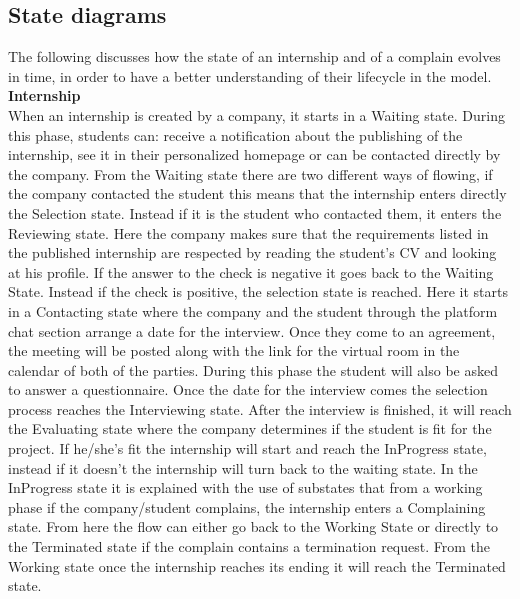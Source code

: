 \subsection{State diagrams}
The following discusses how the state of an internship and of a complain evolves in time, in order to have a better understanding of their lifecycle in the model.\\
\textbf{Internship}\\
When an internship is created by a company, it starts in a Waiting state. During this phase, students can: receive a notification about the publishing of the internship, see it in their personalized homepage or can be contacted directly by the company. From the Waiting state there are two different ways of flowing, if the company contacted the student this means that the internship enters directly the Selection state. Instead if it is the student who contacted them, it enters the Reviewing state. Here the company makes sure that the requirements listed in the published internship are respected by reading the student's CV and looking at his profile. If the answer to the check is negative it goes back to the Waiting State. Instead if the check is positive, the selection state is reached. Here it starts in a Contacting state where the company and the student through the platform chat section arrange a date for the interview. Once they come to an agreement, the meeting will be posted along with the link for the virtual room in the calendar of both of the parties. During this phase the student will also be asked to answer a questionnaire. Once the date for the interview comes the selection process reaches the Interviewing state. After the interview is finished, it will reach the Evaluating state where the company determines if the student is fit for the project. If he/she's fit the internship will start and reach the InProgress state, instead if it doesn't the internship will turn back to the waiting state. In the InProgress state it is explained with the use of substates that from a working phase if the company/student complains, the internship enters a Complaining state. From here the flow can either go back to the Working State or directly to the Terminated state if the complain contains a termination request. From the Working state once the internship reaches its ending it will reach the Terminated state.\\
